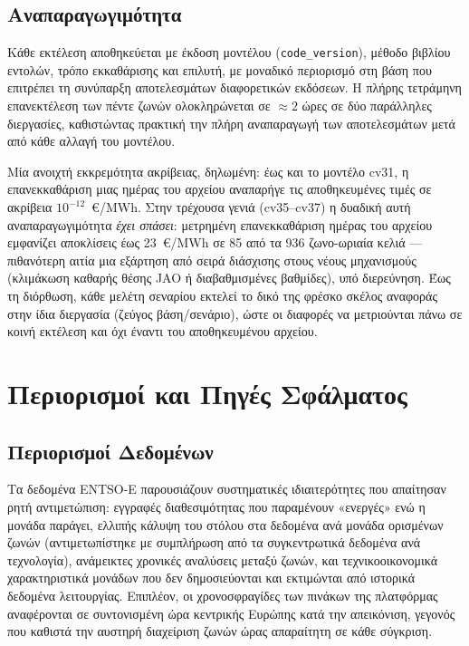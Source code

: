 \subsection{Αναπαραγωγιμότητα}
\label{subsec:reproducibility}

Κάθε εκτέλεση αποθηκεύεται με έκδοση μοντέλου (\texttt{code\_version}), μέθοδο βιβλίου εντολών, τρόπο εκκαθάρισης και επιλυτή, με μοναδικό περιορισμό στη βάση που επιτρέπει τη συνύπαρξη αποτελεσμάτων διαφορετικών εκδόσεων. Η πλήρης τετράμηνη επανεκτέλεση των πέντε ζωνών ολοκληρώνεται σε $\approx 2$ ώρες σε δύο παράλληλες διεργασίες, καθιστώντας πρακτική την πλήρη αναπαραγωγή των αποτελεσμάτων μετά από κάθε αλλαγή του μοντέλου.

Μία ανοιχτή εκκρεμότητα ακρίβειας, δηλωμένη: έως και το μοντέλο cv31, η επανεκκαθάριση μιας ημέρας του αρχείου αναπαρήγε τις αποθηκευμένες τιμές σε ακρίβεια $10^{-12}$~€/MWh. Στην τρέχουσα γενιά (cv35--cv37) η δυαδική αυτή αναπαραγωγιμότητα \emph{έχει σπάσει}: μετρημένη επανεκκαθάριση ημέρας του αρχείου εμφανίζει αποκλίσεις έως 23~€/MWh σε 85 από τα 936 ζωνο-ωριαία κελιά --- πιθανότερη αιτία μια εξάρτηση από σειρά διάσχισης στους νέους μηχανισμούς (κλιμάκωση καθαρής θέσης JAO ή διαβαθμισμένες βαθμίδες), υπό διερεύνηση. Έως τη διόρθωση, κάθε μελέτη σεναρίου εκτελεί το δικό της φρέσκο σκέλος αναφοράς στην ίδια διεργασία (ζεύγος βάση/σενάριο), ώστε οι διαφορές να μετριούνται πάνω σε κοινή εκτέλεση και όχι έναντι του αποθηκευμένου αρχείου.


\section{Περιορισμοί και Πηγές Σφάλματος}
\label{sec:results-limitations}

\subsection{Περιορισμοί Δεδομένων}
\label{subsec:data-limitations}

Τα δεδομένα ENTSO-E παρουσιάζουν συστηματικές ιδιαιτερότητες που απαίτησαν ρητή αντιμετώπιση: εγγραφές διαθεσιμότητας που παραμένουν «ενεργές» ενώ η μονάδα παράγει, ελλιπής κάλυψη του στόλου στα δεδομένα ανά μονάδα ορισμένων ζωνών (αντιμετωπίστηκε με συμπλήρωση από τα συγκεντρωτικά δεδομένα ανά τεχνολογία), ανάμεικτες χρονικές αναλύσεις μεταξύ ζωνών, και τεχνικοοικονομικά χαρακτηριστικά μονάδων που δεν δημοσιεύονται και εκτιμώνται από ιστορικά δεδομένα λειτουργίας. Επιπλέον, οι χρονοσφραγίδες των πινάκων της πλατφόρμας αναφέρονται σε συντονισμένη ώρα κεντρικής Ευρώπης κατά την απεικόνιση, γεγονός που καθιστά την αυστηρή διαχείριση ζωνών ώρας απαραίτητη σε κάθε σύγκριση.

